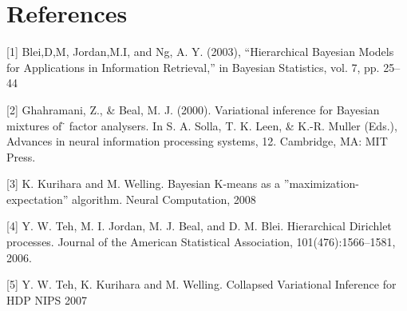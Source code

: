 \documentclass{article}
\begin{document}
\section{References}
\small{
[1]  Blei,D,M, Jordan,M.I, and Ng, A. Y. (2003), “Hierarchical Bayesian Models for Applications 
  in Information Retrieval,” in Bayesian Statistics, vol. 7, pp. 25–44 

[2] Ghahramani, Z., \& Beal, M. J. (2000). Variational inference for Bayesian mixtures of                                                          ̈
  factor analysers. In S. A. Solla, T. K. Leen, \& K.-R. Muller (Eds.), Advances in neural
  information processing systems, 12. Cambridge, MA: MIT Press.

[3] K. Kurihara and M. Welling. Bayesian K-means as a
 ”maximization-expectation” algorithm. Neural Computation, 2008

[4] Y. W. Teh, M. I. Jordan, M. J. Beal, and D. M. Blei. Hierarchical Dirichlet processes. Journal of the 
American Statistical Association, 101(476):1566–1581, 2006.

[5] Y. W. Teh, K. Kurihara and M. Welling. Collapsed Variational Inference for HDP
NIPS 2007

}
\end{document}
